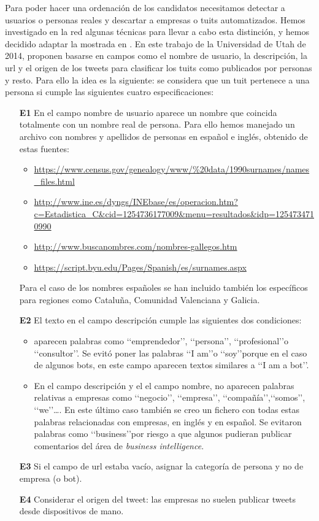 Para poder hacer una ordenación de los candidatos necesitamos detectar a usuarios o personas reales 
y descartar a empresas o tuits automatizados. Hemos investigado en la red algunas técnicas 
para llevar a cabo esta distinción, y hemos decidido adaptar la mostrada en \cite{user_class}.
En este trabajo de la Universidad de Utah de 2014, proponen basarse en campos como el nombre de usuario, 
la descripción, la url y el origen de los tweets para clasificar los tuits como publicados por personas 
y resto. Para ello la idea es la siguiente: se considera que un tuit pertenece a una persona si 
cumple las siguientes cuatro especificaciones:
\begin{itemize}
\item[{\bf E1}] En el campo nombre de usuario aparece un nombre que coincida totalmente con 
un nombre real de persona. Para ello hemos manejado un archivo con nombres y apellidos 
de personas en español e inglés, obtenido de estas fuentes:
\begin{itemize}
\item\url{ https://www.census.gov/genealogy/www/%20data/1990surnames/names_files.html }
\item\url{
http://www.ine.es/dyngs/INEbase/es/operacion.htm?c=Estadistica_C&cid=1254736177009&menu=resultados&idp=1254734710990 }
\item\url{http://www.buscanombres.com/nombres-gallegos.htm }
\item\url{https://script.byu.edu/Pages/Spanish/es/surnames.aspx }
\end{itemize}
Para el caso de los nombres españoles se han incluido también los específicos para regiones como Cataluña, Comunidad Valenciana y Galicia.
\item[{\bf E2}]El texto en el campo descripción cumple las siguientes dos condiciones:
\begin{itemize}
\item aparecen palabras como \lq\lq emprendedor\rq\rq, \lq\lq persona\rq\rq, 
\lq\lq profesional\rq\rq o \lq\lq consultor\rq\rq. Se evitó poner las palabras \lq\lq I am\rq\rq o 
\lq\lq soy\rq\rq porque en el caso de algunos bots, en este campo aparecen textos
similares a \lq\lq I am a bot\rq\rq. 
\item En el campo descripción y el el campo nombre, no aparecen palabras relativas a empresas como 
\lq\lq negocio\rq\rq, \lq\lq empresa\rq\rq, \lq\lq compañía\rq\rq,\lq\lq somos\rq\rq, \lq\lq we\rq\rq\dots.
En este último caso también se creo un fichero con todas estas palabras relacionadas con empresas, 
en inglés y en español. Se evitaron palabras como \lq\lq business\rq\rq por riesgo a que algunos pudieran 
publicar comentarios del área de {\em business intelligence}.
\end{itemize}
\item[{\bf E3}] Si el campo de url estaba vacío, asignar la categoría de persona y no de empresa (o bot).
\item[{\bf E4}] Considerar el origen del tweet: las empresas no suelen publicar tweets desde dispositivos de mano. 
\end{itemize}

